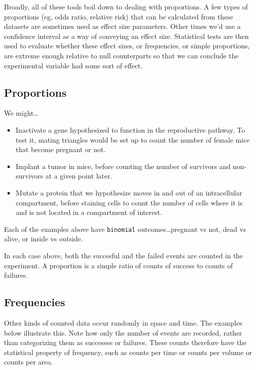 \documentclass[]{book}
\begin{document}
Broadly, all of these tools boil down to dealing with proportions. A few types of proportions (eg, odds ratio, relative risk) that can be calculated from these datasets are sometimes used as effect size parameters. Other times we'd use a confidence interval as a way of conveying an effect size. Statistical tests are then used to evaluate whether these effect sizes, or frequencies, or simple proportions, are extreme enough relative to null counterparts so that we can conclude the experimental variable had some sort of effect.

\hypertarget{proportions}{%
\subsection{Proportions}\label{proportions}}

We might\ldots{}

\begin{itemize}
\item
  Inactivate a gene hypothesized to function in the reproductive pathway. To test it, mating triangles would be set up to count the number of female mice that become pregnant or not.
\item
  Implant a tumor in mice, before counting the number of survivors and non-survivors at a given point later.
\item
  Mutate a protein that we hypothesize moves in and out of an intracellular compartment, before staining cells to count the number of cells where it is and is not located in a compartment of interest.
\end{itemize}

Each of the examples above have \texttt{binomial} outcomes\ldots{}pregnant vs not, dead vs alive, or inside vs outside.

In each case above, both the succesful and the failed events are counted in the experiment. A proportion is a simple ratio of counts of success to counts of failures.

\hypertarget{frequencies}{%
\subsection{Frequencies}\label{frequencies}}

Other kinds of counted data occur randomly in space and time. The examples below illustrate this. Note how only the number of events are recorded, rather than categorizing them as successes or failures. These counts therefore have the statistical property of frequency, such as counts per time or counts per volume or counts per area.
\end{document}
